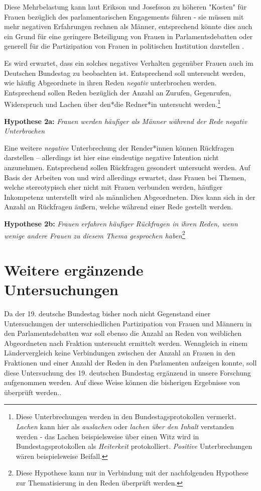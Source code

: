 \documentclass[12pt, 
    twoside=false, 
    bibliography=totoc, 
    numbers=endperiod, 
    headings=normal, 
    toc=chapterentrydotfill
    ]{scrbook}
\begin{document}
Diese Mehrbelastung kann laut Erikson und Josefsson zu höheren "Kosten" für Frauen bezüglich des parlamentarischen Engagements führen - sie müssen mit mehr negativen Erfahrungen rechnen als Männer, entsprechend könnte dies auch ein Grund für eine geringere Beteiligung von Frauen in Parlamentsdebatten oder generell für die Partizipation von Frauen in politischen Institution darstellen \parencites[vgl.][]{erikson_2018}[vgl.][]{back_2014}.

Es wird erwartet, dass ein solches negatives Verhalten gegenüber Frauen auch im Deutschen Bundestag zu beobachten ist. Entsprechend soll untersucht werden, wie häufig Abgeordnete in ihren Reden \emph{negativ} unterbrochen werden. Entsprechend sollen Reden bezüglich der Anzahl an Zurufen, Gegenrufen, Widerspruch und Lachen über den*die Redner*in untersucht werden.\footnote{Diese Unterbrechungen werden in den Bundestagsprotokollen vermerkt. \emph{Lachen} kann hier als \emph{auslachen} oder \emph{lachen über den Inhalt} verstanden werden - das Lachen beispielsweise über einen Witz wird in Bundestagsprotokollen als \emph{Heiterkeit} protokolliert. \emph{Positive} Unterbrechungen wären beispielsweise Beifall.}

\textbf{Hypothese 2a:} \emph{Frauen werden häufiger als Männer während der Rede negativ Unterbrochen}

Eine weitere \emph{negative} Unterbrechung der Render*innen können Rückfragen darstellen -- allerdings ist hier eine eindeutige negative Intention nicht anzunehmen. Entsprechend sollen Rückfragen gesondert untersucht werden. Auf Basis der Arbeiten von \textcite{brescoll_2011} und \textcite{eagly_2002}  wird allerdings erwartet, dass Frauen bei Themen, welche stereotypisch eher nicht mit Frauen verbunden werden, häufiger Inkompetenz unterstellt wird als männlichen Abgeordneten. Dies kann sich in der Anzahl an Rückfragen äußern, welche während einer Rede gestellt werden. 

\textbf{Hypothese 2b:} \emph{Frauen erfahren häufiger Rückfragen in ihren Reden, wenn wenige andere Frauen zu diesem Thema gesprochen haben}\footnote{Diese Hypothese kann nur in Verbindung mit der nachfolgenden Hypothese zur Thematisierung in den Reden überprüft werden.}



\section{Weitere ergänzende Untersuchungen}

Da der 19. deutsche Bundestag bisher noch nicht Gegenstand einer Untersuchungen der unterschiedlichen Partizipation von Frauen und Männern in den Parlamentsdebatten war soll ebenso die Anzahl an Reden von weiblichen Abgeordneten nach Fraktion untersucht ermittelt werden. Wenngleich \textcite{back_2018} in einem Ländervergleich keine Verbindungen zwischen der Anzahl an Frauen in den Fraktionen und einer Anzahl der Reden in den Parlamenten aufzeigen konnte, soll diese Untersuchung des 19. deutschen Bundestag ergänzend in unsere Forschung aufgenommen werden. Auf diese Weise können die bisherigen Ergebnisse von \textcite{back_2018} überprüft werden.. 
\end{document}
